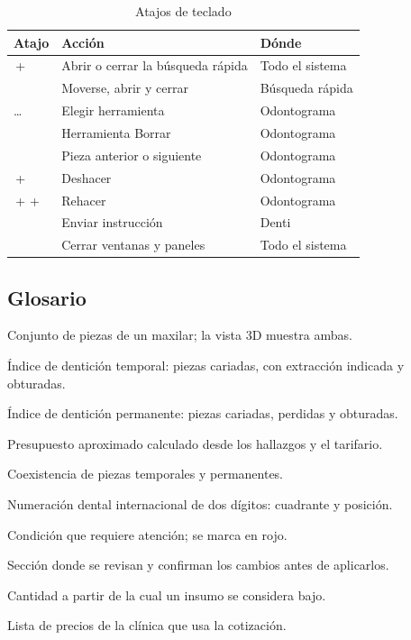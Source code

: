 \documentclass[11pt]{article}
\begin{document}
\begin{table}[H]
\centering\small
\caption{Atajos de teclado}\label{tab:atajos}
\begin{tabularx}{\linewidth}{@{}P{4.4cm}L P{3cm}@{}}
\toprule
\textbf{Atajo} & \textbf{Acción} & \textbf{Dónde} \\
\midrule
{}\,+\, & Abrir o cerrar la búsqueda rápida & Todo el sistema \\
\tecla{$\uparrow$}\,\tecla{$\downarrow$}\ \  & Moverse, abrir y cerrar & Búsqueda rápida \\
 …  & Elegir herramienta & Odontograma \\
 & Herramienta Borrar & Odontograma \\
\tecla{$\leftarrow$}\,\tecla{$\rightarrow$} & Pieza anterior o siguiente & Odontograma \\
\,+\, & Deshacer & Odontograma \\
\,+\,\,+\, & Rehacer & Odontograma \\
 & Enviar instrucción & Denti \\
 & Cerrar ventanas y paneles & Todo el sistema \\
\bottomrule
\end{tabularx}
\end{table}

\subsection{Glosario}

\begin{description}[font=\sffamily\bfseries\color{sdink},leftmargin=0pt,itemsep=0.3em]
  \item[Arcada] Conjunto de piezas de un maxilar; la vista 3D muestra ambas.
  \item[ceo-d] Índice de dentición temporal: piezas cariadas, con extracción indicada y obturadas.
  \item[CPO-D] Índice de dentición permanente: piezas cariadas, perdidas y obturadas.
  \item[Cotización] Presupuesto aproximado calculado desde los hallazgos y el tarifario.
  \item[Dentición mixta] Coexistencia de piezas temporales y permanentes.
  \item[FDI] Numeración dental internacional de dos dígitos: cuadrante y posición.
  \item[Hallazgo] Condición que requiere atención; se marca en rojo.
  \item[Mi espacio] Sección donde se revisan y confirman los cambios antes de aplicarlos.
  \item[Stock mínimo] Cantidad a partir de la cual un insumo se considera bajo.
  \item[Tarifario] Lista de precios de la clínica que usa la cotización.
\end{description}
\end{document}

